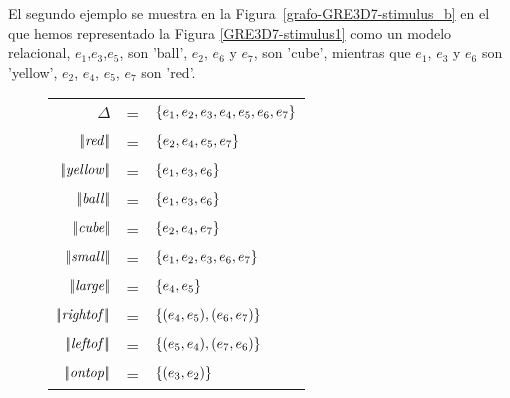 El segundo ejemplo se muestra en la Figura~\ref{grafo-GRE3D7-stimulus_b} en el que hemos representado la Figura \ref{GRE3D7-stimulus1} 
como un modelo relacional, $e_1$,$e_3$,$e_5$, son 'ball', $e_2$, $e_6$ y $e_7$, son 'cube', mientras que 
$e_1$, $e_3$ y $e_6$ son 'yellow', $e_2$, $e_4$, $e_5$, $e_7$ son 'red'.


\begin{figure}
\begin{flushleft}
\begin{tabular}{rcl}
$\Delta$              & = & $\{e_1,e_2,e_3,e_4,e_5,e_6,e_7\}$\\
$|\!|\mathit{red}|\!|$      & = & $\{e_2,e_4,e_5,e_7\}$\\
$|\!|\mathit{yellow}|\!|$   & = & $\{e_1,e_3,e_6\}$\\
$|\!|\mathit{ball}|\!|$     & = & $\{e_1,e_3,e_6\}$\\
$|\!|\mathit{cube}|\!|$     & = & $\{e_2,e_4,e_7\}$\\

$|\!|\mathit{small}|\!|$    & = & $\{e_1,e_2,e_3,e_6,e_7\}$\\
$|\!|\mathit{large}|\!|$    & = & $\{e_4,e_5\}$\\

$|\!|\mathit{rightof}|\!|$   & = & $\{(e_4,e_5),(e_6,e_7)\}$\\
$|\!|\mathit{leftof}|\!|$    & = & $\{(e_5,e_4),(e_7,e_6)\}$\\
$|\!|\mathit{ontop}|\!|$     & = & $\{(e_3,e_2)\}$\\


\end{tabular}
\end{flushleft}
\end{figure}
